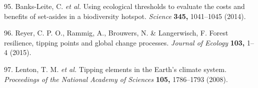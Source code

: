 \documentclass[]{article}
\begin{document}
\hypertarget{ref-Banks-Leite2014}{}
95. Banks-Leite, C. \emph{et al.} Using ecological thresholds to
evaluate the costs and benefits of set-asides in a biodiversity hotspot.
\emph{Science} \textbf{345,} 1041--1045 (2014).

\hypertarget{ref-Reyer2015}{}
96. Reyer, C. P. O., Rammig, A., Brouwers, N. \& Langerwisch, F. Forest
resilience, tipping points and global change processes. \emph{Journal of
Ecology} \textbf{103,} 1--4 (2015).

\hypertarget{ref-Lenton2008}{}
97. Lenton, T. M. \emph{et al.} Tipping elements in the Earth's climate
system. \emph{Proceedings of the National Academy of Sciences}
\textbf{105,} 1786--1793 (2008).
\end{document}
